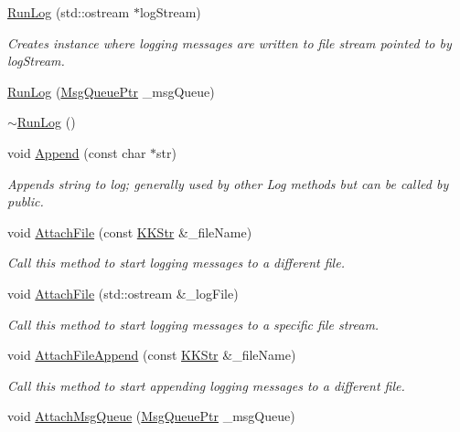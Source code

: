 \begin{DoxyCompactItemize}
\hyperlink{class_k_k_b_1_1_run_log_a6e066445ef7c5dc66471f2fc15814b01}{Run\+Log} (std\+::ostream $\ast$log\+Stream)
\begin{DoxyCompactList}\small\item\em Creates instance where logging messages are written to file stream pointed to by \textquotesingle{}log\+Stream\textquotesingle{}. \end{DoxyCompactList}\item 
\hyperlink{class_k_k_b_1_1_run_log_a7a716ddb14701e753553df8155af0251}{Run\+Log} (\hyperlink{namespace_k_k_b_aaa43074273f12ed325a053d9e1faf84a}{Msg\+Queue\+Ptr} \+\_\+msg\+Queue)
\item 
\hyperlink{class_k_k_b_1_1_run_log_ab2e268a9d080bac9d90104556208bed2}{$\sim$\+Run\+Log} ()
\item 
void \hyperlink{class_k_k_b_1_1_run_log_a362483b3d26c2c6274bdeba514aa2cfd}{Append} (const char $\ast$str)
\begin{DoxyCompactList}\small\item\em Appends string to log; generally used by other Log methods but can be called by public. \end{DoxyCompactList}\item 
void \hyperlink{class_k_k_b_1_1_run_log_a8201bd270fb70816db14aa4bcb0b81d2}{Attach\+File} (const \hyperlink{class_k_k_b_1_1_k_k_str}{K\+K\+Str} \&\+\_\+file\+Name)
\begin{DoxyCompactList}\small\item\em Call this method to start logging messages to a different file. \end{DoxyCompactList}\item 
void \hyperlink{class_k_k_b_1_1_run_log_a823d036a7d738ad28a21aa0a67ab4b00}{Attach\+File} (std\+::ostream \&\+\_\+log\+File)
\begin{DoxyCompactList}\small\item\em Call this method to start logging messages to a specific file stream. \end{DoxyCompactList}\item 
void \hyperlink{class_k_k_b_1_1_run_log_a1457df822b1431891f53200ad8a7f53f}{Attach\+File\+Append} (const \hyperlink{class_k_k_b_1_1_k_k_str}{K\+K\+Str} \&\+\_\+file\+Name)
\begin{DoxyCompactList}\small\item\em Call this method to start appending logging messages to a different file. \end{DoxyCompactList}\item 
void \hyperlink{class_k_k_b_1_1_run_log_a70d1b5456a9ddeb9264ea248bc02df04}{Attach\+Msg\+Queue} (\hyperlink{namespace_k_k_b_aaa43074273f12ed325a053d9e1faf84a}{Msg\+Queue\+Ptr} \+\_\+msg\+Queue)

\end{DoxyCompactItemize}
